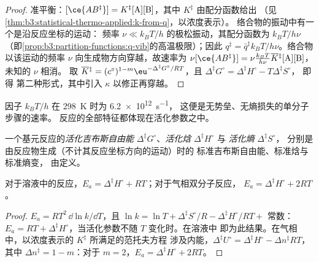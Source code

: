 \begin{proof}
准平衡：$[\ce{AB^{\ddagger}}] = K^{\ddagger}[\mathrm A][\mathrm B]$，其中 $K^{\ddagger}$ 由配分函数给出
（见\cref{thm:b3:statistical-thermo-applied:k-from-q}，以浓度表示）。
络合物的振动中有一个是沿反应坐标的运动：
频率 $\nu \ll k_BT/h$ 的极松振动，其配分函数为 $k_BT/h\nu$
（即\cref{prop:b3:partition-functions:q-vib}的高温极限）；因此
$q^{\ddagger} = \bar q^{\ddagger}k_BT/h\nu$。络合物以该运动的频率 $\nu$ 向生成物方向穿越，故速率为
$\nu[\ce{AB^{\ddagger}}] = \nu\frac{k_BT}{h\nu}\overline{K}{}^{\ddagger}[\mathrm A][\mathrm B]$，未知的 $\nu$ 相消。
取 $\overline{K}{}^{\ddagger} = (c^\circ)^{1-m}\eu^{-\Delta^{\ddagger}G^\circ/RT}$，且 $\Delta^{\ddagger}G^\circ = \Delta^{\ddagger}H^\circ - T\Delta^{\ddagger}S^\circ$，
即得
第二种形式，其中引入 $\kappa$ 以修正再穿越。
\end{proof}

因子 $k_BT/h$ 在 \qty{298}{K} 时为 \qty{6.2e12}{s^{-1}}，
这便是无势垒、无熵损失的单分子步骤的速率。
反应的全部特征都体现在活化参数之中。

\begin{definition}\label{def:b3:rate-theories:activation}
一个基元反应的\emph{活化吉布斯自由能}
$\Delta^{\ddagger}G^\circ$、\emph{活化焓} $\Delta^{\ddagger}H^\circ$ 与
\emph{活化熵} $\Delta^{\ddagger}S^\circ$，
分别是由反应物生成（不计其反应坐标方向的运动）时的
标准吉布斯自由能、标准焓与标准熵变，
由定义。
\end{definition}

\begin{proposition}[活化能与活化焓]\label{prop:b3:rate-theories:ea-dh}
对于溶液中的反应，$E_a = \Delta^{\ddagger}H^\circ + RT$；对于气相双分子反应，
$E_a = \Delta^{\ddagger}H^\circ + 2RT$。
\end{proposition}

\begin{proof}
$E_a = RT^2\,\dd\ln k/\dd T$，且 $\ln k = \ln T + \Delta^{\ddagger}S^\circ/R - \Delta^{\ddagger}H^\circ/RT + $ 常数：$E_a =
RT + \Delta^{\ddagger}H^\circ$，当活化参数不随 $T$ 变化时。在溶液中
即为此结果。在气相中，以浓度表示的 $K^{\ddagger}$ 所满足的范托夫方程
涉及内能，$\Delta^{\ddagger}U^\circ = \Delta^{\ddagger}H^\circ - \Delta n^{\ddagger}RT$，
其中 $\Delta n^{\ddagger} = 1 - m$：对于 $m = 2$，$E_a = \Delta^{\ddagger}H^\circ + 2RT$。
\end{proof}

